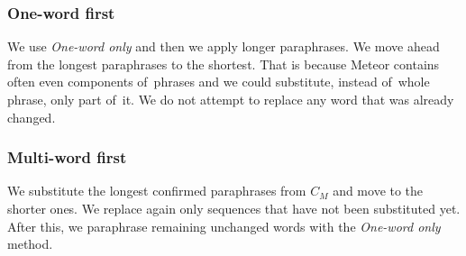 \documentclass[11pt]{article}
\begin{document}
\subsubsection*{One-word first}
We use \textit{One-word only} and then we apply longer paraphrases.
We move ahead from the longest paraphrases to the shortest. That is because 
Meteor contains often even components of~phrases and we could substitute, instead of~whole 
phrase, only part of~it. We do not attempt to replace any word that was already changed.
\subsubsection*{Multi-word first}
We substitute the longest confirmed paraphrases from
$ C_{M} $ and move to the shorter ones. We replace again only sequences that have not
been substituted yet. After this, we paraphrase remaining unchanged words
with the \textit{One-word only} method.
\end{document}
